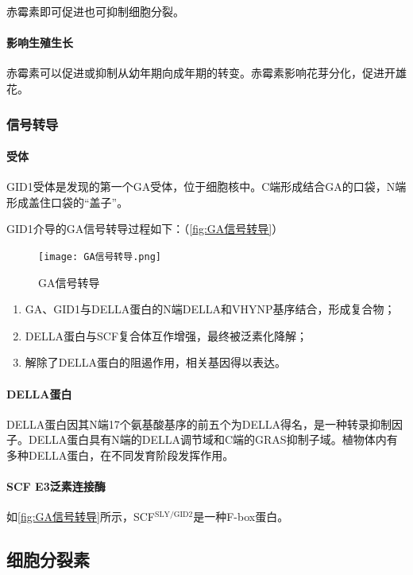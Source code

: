 赤霉素即可促进也可抑制细胞分裂。

\paragraph{影响生殖生长}

赤霉素可以促进或抑制从幼年期向成年期的转变。赤霉素影响花芽分化，促进开雄花。


\subsubsection{信号转导}

\paragraph{受体}

GID1受体是发现的第一个GA受体，位于细胞核中。C端形成结合GA的口袋，N端形成盖住口袋的“盖子”。

GID1介导的GA信号转导过程如下：（\autoref{fig:GA信号转导}）

\begin{figure}[htbp]
	\centering
	\texttt{[image: GA信号转导.png]}
	\caption{GA信号转导}
	\label{fig:GA信号转导}
\end{figure}

\begin{enumerate}
	\item GA、GID1与DELLA蛋白的N端DELLA和VHYNP基序结合，形成复合物；
	\item DELLA蛋白与SCF复合体互作增强，最终被泛素化降解；
	\item 解除了DELLA蛋白的阻遏作用，相关基因得以表达。
\end{enumerate}

\paragraph{DELLA蛋白}

DELLA蛋白因其N端17个氨基酸基序的前五个为DELLA得名，是一种转录抑制因子。DELLA蛋白具有N端的DELLA调节域和C端的GRAS抑制子域。植物体内有多种DELLA蛋白，在不同发育阶段发挥作用。

\paragraph{SCF E3泛素连接酶}

如\autoref{fig:GA信号转导}所示，SCF$^{\text{SLY/GID2}}$是一种F-box蛋白。

\subsection{细胞分裂素}

